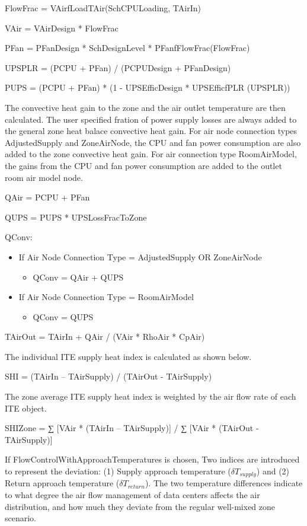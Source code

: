 FlowFrac = VAirfLoadTAir(SchCPULoading, TAirIn)

VAir = VAirDesign * FlowFrac

PFan = PFanDesign * SchDesignLevel * PFanfFlowFrac(FlowFrac)

UPSPLR = (PCPU + PFan) / (PCPUDesign + PFanDesign)

PUPS = (PCPU + PFan) * (1 - UPSEfficDesign * UPSEfficfPLR (UPSPLR))

The convective heat gain to the zone and the air outlet temperature are then calculated. The user specified fration of power supply losses are always added to the general zone heat balace convective heat gain. For air node connection types AdjustedSupply and ZoneAirNode, the CPU and fan power consumption are also added to the zone convective heat gain. For air connection type RoomAirModel, the gains from the CPU and fan power consumption are added to the outlet room air model node.

QAir = PCPU + PFan

QUPS = PUPS * UPSLossFracToZone

QConv:

\begin{itemize}
    \tightlist
  \item
    If Air Node Connection Type = AdjustedSupply OR ZoneAirNode
    \begin{itemize}
      \item   QConv = QAir + QUPS
    \end{itemize}
  \item
    If Air Node Connection Type = RoomAirModel
    \begin{itemize}
      \item   QConv = QUPS
    \end{itemize}
\end{itemize}

TAirOut = TAirIn + QAir / (VAir * RhoAir * CpAir)

The individual ITE supply heat index is calculated as shown below.

SHI = (TAirIn -- TAirSupply) / (TAirOut - TAirSupply)

The zone average ITE supply heat index is weighted by the air flow rate of each ITE object.

SHIZone = ∑ {[}VAir * (TAirIn -- TAirSupply){]} / ∑ {[}VAir * (TAirOut - TAirSupply){]}


If FlowControlWithApproachTemperatures is chosen, Two indices are introduced to represent the deviation: (1) Supply approach temperature ($\delta T_{supply}$) and (2) Return approach temperature ($\delta T_{return}$). The two temperature differences indicate to what degree the air flow management of data centers affects the air distribution, and how much they deviate from the regular well-mixed zone scenario.

